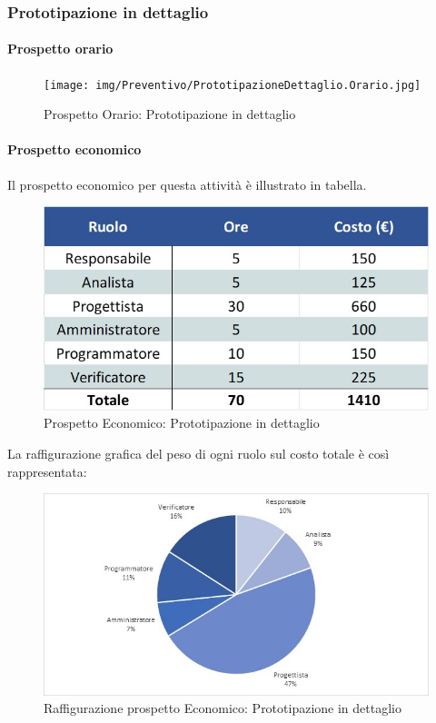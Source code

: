 \subsubsection{Prototipazione in dettaglio}
\paragraph{Prospetto orario}
\begin{figure}[h!]
	\centerline{\texttt{[image: img/Preventivo/PrototipazioneDettaglio.Orario.jpg]}}
	\caption{Prospetto Orario: Prototipazione in dettaglio}
\end{figure}
\paragraph{Prospetto economico}
Il prospetto economico per questa attività è illustrato in tabella. 
\begin{figure}[h!]
	\centerline{\includegraphics[scale=0.4]{img/Preventivo/PrototipazioneDettaglio.Economico.jpg}}
	\caption{Prospetto Economico: Prototipazione in dettaglio}
\end{figure}
La raffigurazione grafica del peso di ogni ruolo sul costo totale è così rappresentata:
\begin{figure}[h!]
	\centerline{\includegraphics[scale=0.4]{img/Preventivo/Torte/PrototipazioneDettaglio.jpg}}
	\caption{Raffigurazione prospetto Economico: Prototipazione in dettaglio}
\end{figure} 


